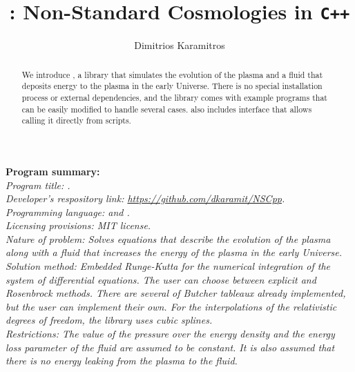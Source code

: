 \documentclass[11pt,a4paper]{article}
\author[ ]{Dimitrios Karamitros}
\affil[ ]{\em Department of Physics and Astronomy, The University of Manchester,}
\affil[ ]{\em Manchester M13 9PL, United Kingdom}
\affil[ ]{}
\affil[ ]{\textit{E-mail: } \href{mailto:dimitrios.karamitros@manchester.ac.uk}{\color{blue}{dimitrios.karamitros@manchester.ac.uk}}}
\title{\nsc: Non-Standard Cosmologies in {\tt C++}}
\begin{document}
\maketitle


\begin{abstract}
We introduce \nsc, a \CPP library that simulates the evolution of the plasma and a fluid that deposits energy to the plasma in the early Universe.
%
There is no special installation process or external dependencies, and the library comes with example programs that can be easily modified to handle several cases. \nsc also includes \PY interface that allows calling it directly from \PY scripts.
\end{abstract}

\noindent
{\bf Program summary:}\\

{\sl 
	Program title: \nsc.\\
	
	Developer's respository link: \href{https://github.com/dkaramit/NSCpp}{https://github.com/dkaramit/NSCpp}.\\
	
	Programming language: \CPP and \PY.\\
	
	Licensing provisions: MIT license.\\
	
	Nature of problem: Solves equations that describe the evolution of the plasma along with a fluid that increases the energy of the plasma in the early Universe.\\
	
	Solution method: Embedded Runge-Kutta for the numerical integration of the system of differential equations. The user can choose between explicit and Rosenbrock methods. There are several of Butcher tableaux already implemented, but the user can implement their own. For the interpolations of the relativistic degrees of freedom, the library uses cubic splines.\\ 
	
	Restrictions: The value of the pressure over the energy density and the energy loss parameter of the fluid are assumed to be constant. It is also assumed that there is no energy leaking from the plasma to the fluid.
}

\tableofcontents
\end{document}
